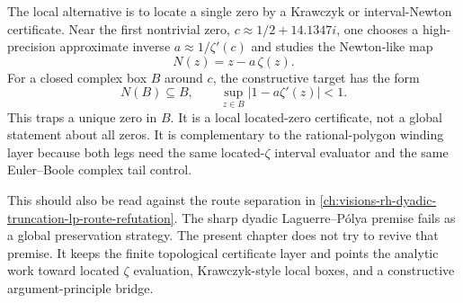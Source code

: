 \begin{principle}
\label{prin:rh-winding-located-zero-complement}
The local alternative is to locate a single zero by a Krawczyk or
interval-Newton certificate. Near the first nontrivial zero,
$c\approx 1/2+14.1347i$, one chooses a high-precision approximate inverse
$a\approx 1/\zeta'(c)$ and studies the Newton-like map
$$
N(z)=z-a\,\zeta(z).
$$
For a closed complex box $B$ around $c$, the constructive target has the form
$$
N(B)\subseteq B,
\qquad
\sup_{z\in B}|1-a\zeta'(z)|<1.
$$
This traps a unique zero in $B$. It is a local located-zero certificate, not a
global statement about all zeros. It is complementary to the rational-polygon
winding layer because both legs need the same located-$\zeta$ interval
evaluator and the same Euler--Boole complex tail control.
\end{principle}

This should also be read against the route separation in
\autoref{ch:visions-rh-dyadic-truncation-lp-route-refutation}. The sharp
dyadic Laguerre--P\'olya premise fails as a global preservation strategy. The
present chapter does not try to revive that premise. It keeps the finite
topological certificate layer and points the analytic work toward located
$\zeta$ evaluation, Krawczyk-style local boxes, and a constructive
argument-principle bridge.

\begin{closurestatus}{\ConstructiveWindingCertificateUp}
  \theoryclosure{\scopedClosure}
  \formalstatus{\theoremCheckedV}
\end{closurestatus}
